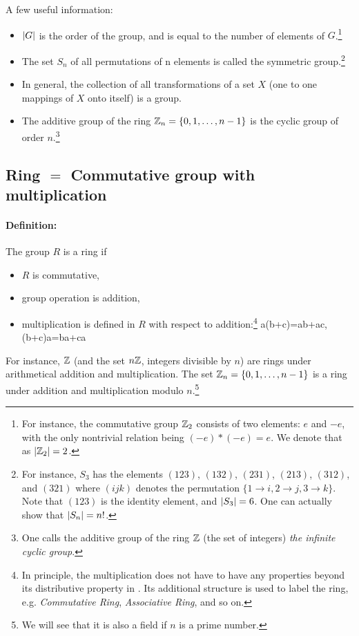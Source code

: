 A few useful information:
\begin{itemize}
\item $\abs{G}$ is the order of the group, and is equal to the number of elements of $G$.\footnote{For instance, the commutative group $\mathbb{Z}_2$ consists of two elements: $e$ and $-e$, with the only nontrivial relation being $(-e)*(-e)=e$. We denote that as $\abs{\mathbb{Z}_2}=2$.}

\item The set $S_n$ of all permutations of n elements is called the symmetric group.\footnote{For instance, $S_3$ has the elements $(123)$, $(132)$, $(231)$, $(213)$, $(312)$, and $(321)$ where $(ijk)$ denotes the permutation $\{1\to i, 2\to j, 3\to k\}$. Note that $(123)$ is the identity element, and $\abs{S_3}=6$. One can actually show that $\abs{S_n}=n!$.}

\item In general, the collection of all transformations of a set $X$ (one to one mappings of $X$ onto itself) is a group.

\item The additive group of the ring $\mathbb{Z}_n=\{0,1,\dots,n-1\}$ is the cyclic group of order $n$.\footnote{One calls the additive group of the ring $\mathbb{Z}$ (the set of integers) \emph{the infinite cyclic group}.}
\end{itemize}

\subsection{Ring $=$ Commutative group with multiplication}
\paragraph{Definition:} The group $R$ is a ring if
\begin{itemize}
	\item $R$ is commutative,
	\item group operation is addition,
	\item multiplication is defined in $R$ with respect to addition:\footnote{In principle, the multiplication does not have to have any properties beyond its distributive property in . Its additional structure is used to label the ring, e.g. \emph{Commutative Ring}, \emph{Associative Ring}, and so on.}
	\be 
	\label{eq: distributive property of multiplication in ring}
	a(b+c)=ab+ac\;,(b+c)a=ba+ca
	\ee 
\end{itemize}
For instance, $\mathbb{Z}$ (and the set $n\mathbb{Z}$, integers divisible by $n$) are rings under arithmetical addition and multiplication. The set $\mathbb{Z}_n=\{0,1,\dots,n-1\}$ is a ring under addition and multiplication modulo $n$.\footnote{We will see that it is also a field if $n$ is a prime number.}

